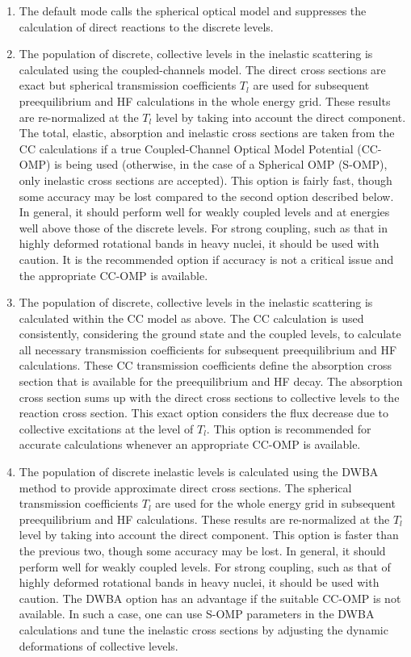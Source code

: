 \begin{enumerate}
\item The default mode calls the spherical optical model and suppresses the
calculation of direct reactions to the discrete levels.

\item The population of discrete, collective levels in the inelastic
scattering is calculated using the coupled-channels model. The direct cross
sections are exact but spherical transmission coefficients $T_{l}$ are used
for subsequent preequilibrium and HF calculations in the whole energy grid.
These results are re-normalized at the $T_{l}$ level by taking into account
the direct component. The total, elastic, absorption and inelastic cross
sections are taken from the CC calculations if a true Coupled-Channel
Optical Model Potential (CC-OMP) is being used (otherwise, in the case of
a Spherical OMP (S-OMP), only inelastic cross sections are accepted). This
option is fairly fast, though some accuracy may be lost compared to the
second option described below. In general, it should perform well for weakly
coupled levels and at energies well above those of
the discrete levels. For strong
coupling, such as that in highly deformed rotational bands in heavy nuclei,
it should be used with caution. It is the recommended option if accuracy is
not a critical issue and the appropriate CC-OMP is available.

\item The population of discrete, collective levels in the inelastic
scattering is calculated within the CC model as above. The CC
calculation is
used consistently, considering the ground state and the coupled levels, to
calculate all necessary transmission coefficients for subsequent
preequilibrium and HF calculations. These CC transmission coefficients
define the absorption cross section that is available for the preequilibrium
and HF decay. The absorption cross section sums up with the direct cross
sections to collective levels to the reaction cross section. This exact
option considers the flux decrease due to collective excitations at the
level of $T_{l}$.
This option is recommended for accurate calculations whenever an appropriate
CC-OMP is available.

\item The population of discrete inelastic levels
is calculated using the DWBA method to provide approximate direct
cross sections. The spherical transmission coefficients $T_{l}$ are used for
the whole energy grid in subsequent pre\-equilibrium and HF calculations.
These results are re-normalized at the $T_{l}$ level by taking into account
the direct component. This option is faster than the previous two, though
some accuracy may be lost. In general, it should perform well for weakly
coupled levels. For strong coupling, such as that of highly deformed
rotational bands in heavy nuclei, it should be used with caution. The DWBA
option has an advantage if the suitable CC-OMP is not available. In such a
case, one can use S-OMP parameters in the DWBA calculations and tune
the inelastic
cross sections by adjusting the dynamic deformations of collective levels.
\end{enumerate}

